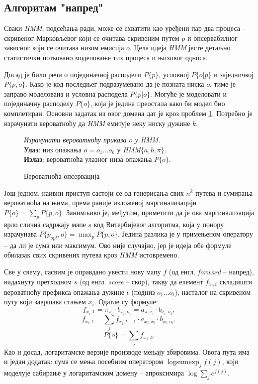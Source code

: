 \documentclass[12pt,oneside]{memoir}
\newenvironment{problem}[1][!ht]
{\renewcommand{\algorithmcfname}{Проблем}
\begin{figure}[!ht]
\centering
  \begin{minipage}{.94\linewidth}
	\begin{algorithm}[#1]%
  }{\end{algorithm}
  \end{minipage}
\end{figure}}
\begin{document}
\begin{CJK}{UTF8}{ipxm}
\section{Алгоритам "напред"}
Сваки \textit{HMM}, подсећања ради, може се схватити као уређени пар два процеса -- скривеног Марковљевог који се очитава скривеним путем $p$ и опсервабилног зависног који се очитава низом емисија $o$. Цела идеја \textit{HMM} јесте детаљно статистички потковано моделовање тих процеса и њиховог односа.

Досад је било речи о појединачној расподели $P\{p\}$, условној $P\{o | p\}$ и заједничкој $P\{p, o\}$. Како је код последњег подразумевано да је позната ниска $o$, тиме је заправо моделована и условна расподела $P\{p | o\}$. Могуће је моделовати и појединачну расподелу $P\{o\}$, која је једина преостала како би модел био комплетиран. Основни задатак из овог домена дат је кроз проблем \ref{prob:ops}. Потребно је израчунати вероватноћу да \textit{HMM} емитује неку ниску дужине $k$.

\begin{problem}[H]
  \SetAlgoLined
  \textit{Израчунати вероватноћу приказа $o$ у \textit{HMM}.}\\
  \textbf{Улаз}: низ опажања $o = o_1...o_k$ у \textit{HMM}$\{a, b, \pi\}$.\\
  \textbf{Излаз}: вероватноћа улазног низа опажања $P\{o\}$.
  \caption{Вероватноћа опсервација\cite{ba10d}}
  \label{prob:ops}
\end{problem}

Још једном, наивни приступ састоји се од генерисања свих $n^k$ путева и сумирања вероватноћа на њима, према раније изложеној маргинализацији $P\{o\} = \sum_p P\{p, o\}$. Занимљиво је, међутим, приметити да је ова маргинализација врло слична садржају мапе $s$ код Витербијевог алгоритма, која у понору израчунава $P\{p_{opt}, o\} = \max_p P\{p, o\}$. Једина разлика је у примењеном оператору -- да ли је сума или максимум. Ово није случајно, јер је идеја обе формуле обилазак свих скривених путева кроз \textit{HMM} истовремено.

Све у свему, сасвим је оправдано увести нову мапу $f$ (од енгл. \textit{forward} -- напред), надахнуту претходном $s$ (од енгл. \textit{score} -- скор), такву да елемент $f_{x_i, t}$ складишти вероватноћу префикса опажања дужине $t$ (подниз $o_1...o_t$), насталог на скривеном путу који завршава стањем $x_i$. Одатле су формуле: $$f_{x_i, 1} = \pi_{x_i} \cdot b_{x_i, o_1} = a_{\pi, x_i} \cdot b_{x_i, o_1},$$ $$f_{x_i, t} = \sum_j f_{x_j, t-1} \cdot a_{x_j, x_i} \cdot b_{x_i, o_t},$$ $$P\{o\} = \sum_j f_{x_j, k}.$$ Као и досад, логаритамске верзије производе мењају збировима. Овога пута има и један додатак: сума се мења посебним оператором $\operatorname{logsumexp}_j f(j)$, који моделује сабирање у логаритамском домену -- апроксимира $\log \sum_j e^{f(j)}$.


\end{CJK}
\end{document}
